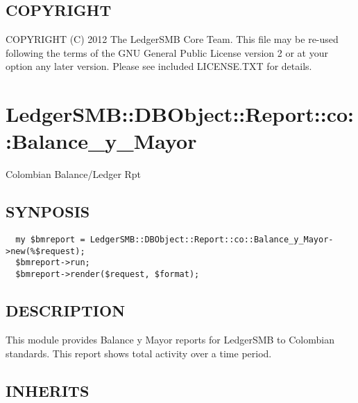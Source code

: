 \begin{description}
\begin{description}
\begin{description}
\begin{description}
\begin{description}
\begin{description}
\begin{description}
\begin{description}
\begin{description}
\begin{description}
\begin{description}
\end{description}
\subsection*{COPYRIGHT\label{LedgerSMB::DBObject::Report::Aging_COPYRIGHT}}


COPYRIGHT (C) 2012 The LedgerSMB Core Team.  This file may be re-used following
the terms of the GNU General Public License version 2 or at your option any
later version.  Please see included LICENSE.TXT for details.

\section{LedgerSMB::DBObject::Report::co::Balance\_y\_Mayor\label{LedgerSMB::DBObject::Report::co::Balance_y_Mayor}}


Colombian Balance/Ledger Rpt

\subsection*{SYNPOSIS\label{LedgerSMB::DBObject::Report::co::Balance_y_Mayor_SYNPOSIS}}
\begin{verbatim}
  my $bmreport = LedgerSMB::DBObject::Report::co::Balance_y_Mayor->new(%$request);
  $bmreport->run;
  $bmreport->render($request, $format);
\end{verbatim}
\subsection*{DESCRIPTION\label{LedgerSMB::DBObject::Report::co::Balance_y_Mayor_DESCRIPTION}}


This module provides Balance y Mayor reports for LedgerSMB to Colombian 
standards. This report shows total activity over a time period.

\subsection*{INHERITS\label{LedgerSMB::DBObject::Report::co::Balance_y_Mayor_INHERITS}}
\begin{description}


\end{description}
\end{description}
\end{description}
\end{description}
\end{description}
\end{description}
\end{description}
\end{description}
\end{description}
\end{description}
\end{description}
